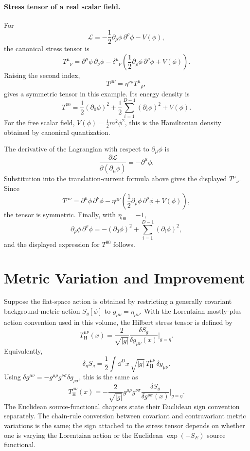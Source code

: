\paragraph{Stress tensor of a real scalar field.}
For
\[
  \mathcal L
  =
  -\frac12\partial_\rho\phi\,\partial^\rho\phi
  -
  V(\phi),
\]
the canonical stress tensor is
\[
  T^\mu{}_\nu
  =
  \partial^\mu\phi\,\partial_\nu\phi
  -
  \delta^\mu{}_\nu
  \left(
    \frac12\partial_\rho\phi\,\partial^\rho\phi+V(\phi)
  \right).
\]
Raising the second index,
\[
  T^{\mu\nu}=\eta^{\nu\rho}T^\mu{}_\rho,
\]
gives a symmetric tensor in this example.  Its energy density is
\[
  T^{00}
  =
  \frac12(\partial_0\phi)^2
  +
  \frac12\sum_{i=1}^{D-1}(\partial_i\phi)^2
  +
  V(\phi).
\]
For the free scalar field, \(V(\phi)=\frac12m^2\phi^2\), this is the
Hamiltonian density obtained by canonical quantization.

The derivative of the Lagrangian with respect to \(\partial_\mu\phi\) is
\[
  \frac{\partial\mathcal L}{\partial(\partial_\mu\phi)}
  =
  -\partial^\mu\phi .
\]
Substitution into the translation-current formula above
gives the displayed \(T^\mu{}_\nu\).  Since
\[
  T^{\mu\nu}
  =
  \partial^\mu\phi\,\partial^\nu\phi
  -
  \eta^{\mu\nu}
  \left(
    \frac12\partial_\rho\phi\,\partial^\rho\phi+V(\phi)
  \right),
\]
the tensor is symmetric.  Finally, with \(\eta_{00}=-1\),
\[
  \partial_\rho\phi\,\partial^\rho\phi
  =
  -(\partial_0\phi)^2+\sum_{i=1}^{D-1}(\partial_i\phi)^2,
\]
and the displayed expression for \(T^{00}\) follows.

\section{Metric Variation and Improvement}

\begin{definition}
\label{def:lorentzian-hilbert-stress-tensor}
Suppose the flat-space action is obtained by restricting a generally covariant
background-metric action \(S_g[\phi]\) to \(g_{\mu\nu}=\eta_{\mu\nu}\).  With
the Lorentzian mostly-plus action convention used in this volume, the Hilbert
stress tensor is defined by
\[
  T_{\mathrm H}^{\mu\nu}(x)
  =
  \frac{2}{\sqrt{|g|}}
  \frac{\delta S_g}{\delta g_{\mu\nu}(x)}
  \bigg|_{g=\eta}.
\]
Equivalently,
\[
  \delta_g S_g
  =
  \frac12
  \int\dd^Dx\,\sqrt{|g|}\,
  T_{\mathrm H}^{\mu\nu}\,\delta g_{\mu\nu}.
\]
Using
\(\delta g^{\mu\nu}=-g^{\mu\rho}g^{\nu\sigma}\delta g_{\rho\sigma}\), this is
the same as
\[
  T_{\mathrm H}^{\mu\nu}(x)
  =
  -\frac{2}{\sqrt{|g|}}
  g^{\mu\rho}g^{\nu\sigma}
  \frac{\delta S_g}{\delta g^{\rho\sigma}(x)}
  \bigg|_{g=\eta}.
\]
The Euclidean source-functional chapters state their Euclidean sign convention
separately.  The chain-rule conversion between covariant and contravariant
metric variations is the same; the sign attached to the stress tensor depends
on whether one is varying the Lorentzian action or the Euclidean
\(\exp(-S_E)\) source functional.
\end{definition}

